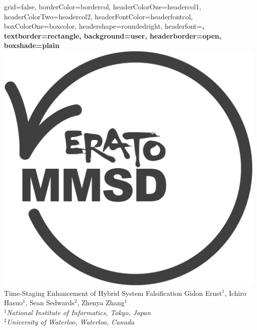 \documentclass[a0paper,portrait]{baposter}
\begin{document}
\begin{poster}{
grid=false,
borderColor=bordercol, %
headerColorOne=headercol1, %
headerColorTwo=headercol2, %
headerFontColor=headerfontcol, %
boxColorOne=boxcolor, %
headershape=roundedright, %
headerfont=\Large\sf\bf, %
textborder=rectangle,
background=user,
headerborder=open, %
boxshade=plain
}
{\includegraphics[scale=0.2]{erato.png}}
%
%
{\huge    {Time-Staging Enhancement of Hybrid System Falsification} } %
{\vspace{0.3em} \smaller Gidon Ernst$^1$, Ichiro Hasuo$^1$, Sean Sedwards$^2$, Zhenya Zhang$^1$  \\  %
  
\smaller $^1$\it {National Institute of Informatics, Tokyo, Japan} \\ $^2$\it{University of Waterloo, Waterloo, Canada} } %


\end{poster}
\end{document}
